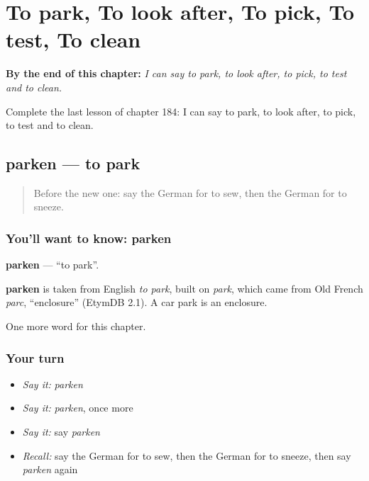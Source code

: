 
\chapter{To park, To look after, To pick, To test, To clean}
\label{ch:ge-to-park-to-look-after-to-pick-to-test-to-clean}

\begin{chapteropening}
\textbf{By the end of this chapter:} \emph{I can say to park, to look after, to pick, to test and to clean.}

Complete the last lesson of chapter 184: I can say to park, to look after, to pick, to test and to clean.
\end{chapteropening}

\section[parken]{parken — to park}

\label{lesson:GE-C184-parken}



\begin{quote}
Before the new one: say the German for to sew, then the German for to sneeze.
\end{quote}

\subsection*{You'll want to know: parken}
\textbf{parken} — \textquotedblleft{}to park\textquotedblright{}.

\begin{cousinweb}
\textbf{parken} is taken from English \emph{to park}, built on \emph{park}, which came from Old French \emph{parc}, \textquotedblleft{}enclosure\textquotedblright{} (EtymDB 2.1). A car park is an enclosure.
\end{cousinweb}

\begin{grammarlens}[title={What you've built}]
One more word for this chapter.
\end{grammarlens}

\subsection*{Your turn}
\begin{itemize}
\raggedright
  \item \emph{Say it:} \emph{parken}
  \item \emph{Say it:} \emph{parken}, once more
  \item \emph{Say it:} say \emph{parken}
  \item \emph{Recall:} say the German for to sew, then the German for to sneeze, then say \emph{parken} again
\end{itemize}

